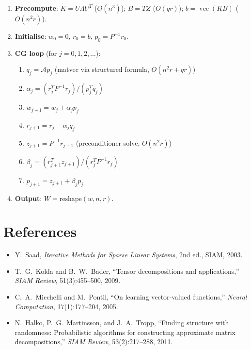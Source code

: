 \documentclass[12pt]{article}
\theoremstyle{definition}
\theoremstyle{remark}
\DeclareMathOperator{\vecop}{vec}
\begin{document}
\begin{enumerate}
\item \textbf{Precompute}: $K = U\Lambda U^T$ ($O(n^3)$);
  $B = TZ$ ($O(qr)$); $b = \vecop(KB)$ ($O(n^2r)$).
\item \textbf{Initialise}: $w_0 = 0$, $r_0 = b$, $p_0 = P^{-1}r_0$.
\item \textbf{CG loop} (for $j = 0,1,2,\dots$):
  \begin{enumerate}
  \item $q_j = \mathcal{A}p_j$ (matvec via structured formula, $O(n^2r+qr)$)
  \item $\alpha_j = (r_j^T P^{-1}r_j)/(p_j^T q_j)$
  \item $w_{j+1} = w_j + \alpha_j p_j$
  \item $r_{j+1} = r_j - \alpha_j q_j$
  \item $z_{j+1} = P^{-1}r_{j+1}$ (preconditioner solve, $O(n^2r)$)
  \item $\beta_j = (r_{j+1}^T z_{j+1})/(r_j^T P^{-1}r_j)$
  \item $p_{j+1} = z_{j+1} + \beta_j p_j$
  \end{enumerate}
\item \textbf{Output}: $W = \mathrm{reshape}(w, n, r)$.
\end{enumerate}

\section*{References}

\begin{itemize}
\item Y.~Saad, \emph{Iterative Methods for Sparse Linear Systems}, 2nd ed.,
  SIAM, 2003.
\item T.~G.~Kolda and B.~W.~Bader, ``Tensor decompositions and applications,''
  \emph{SIAM Review}, 51(3):455--500, 2009.
\item C.~A.~Micchelli and M.~Pontil, ``On learning vector-valued functions,''
  \emph{Neural Computation}, 17(1):177--204, 2005.
\item N.~Halko, P.~G.~Martinsson, and J.~A.~Tropp, ``Finding structure with
  randomness: Probabilistic algorithms for constructing approximate matrix
  decompositions,'' \emph{SIAM Review}, 53(2):217--288, 2011.
\end{itemize}
\end{document}
